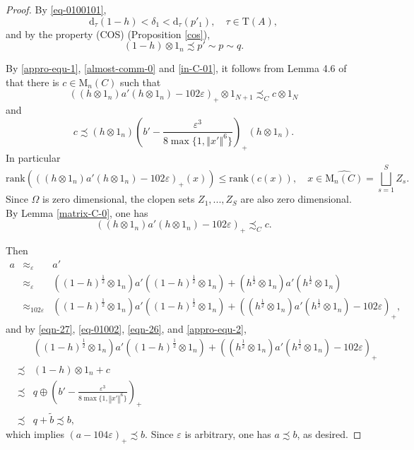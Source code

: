 \documentclass[12pt, oneside, psamsfonts]{amsart}
\theoremstyle{definition}
\theoremstyle{remark}
\numberwithin{equation}{section}
\newcommand{\norm}[1]{\left\Vert#1\right\Vert}
\newcommand{\eps}{\varepsilon}
\newcommand{\tr}{\mathrm{T}}
\begin{document}
\begin{proof}
By \eqref{eq-0100101}, $$\mathrm d_\tau(1-h) < \delta_1 < \mathrm{d}_\tau(p'_1),\quad \tau \in \tr(A),$$
and by the property (COS) (Proposition \ref{cos}), 
\begin{equation}\label{eq-01002}
(1 - h)\otimes 1_n \precsim p' \sim p \sim q.
\end{equation}


By \eqref{appro-equ-1}, \eqref{almost-comm-0} and \eqref{in-C-01}, it follows from Lemma 4.6 of \cite{Niu-MD-Z} that there is $c \in \mathrm{M}_n(C)$ such that
$$ ((h\otimes 1_n)a'(h\otimes 1_n) - 102\eps)_+\otimes 1_{N+1} \precsim_C c \otimes 1_N$$
and
\begin{equation}\label{eqn-26}
c \precsim (h \otimes 1_n )(b' - \frac{\eps^3}{8 \max\{1, \norm{x'}^6\}})_+(h\otimes 1_n).
\end{equation}
In particular
$$ \mathrm{rank}(((h\otimes 1_n)a'(h\otimes 1_n) - 102\eps)_+(x)) \leq \mathrm{rank}(c(x)), \quad x\in \widehat{\mathrm{M}_n(C)} = \bigsqcup_{s = 1}^S Z_s.$$
Since $\Omega$ is zero dimensional, the clopen sets $Z_1, ..., Z_S$ are also zero dimensional. By Lemma \ref{matrix-C-0}, 
one has 
\begin{equation}\label{eqn-27}
((h\otimes 1_n)a'(h\otimes 1_n) - 102\eps)_+ \precsim_C c.
\end{equation}

Then
\begin{eqnarray*}
a 
& \approx_{\eps} &
a' \\
& \approx_\eps &
((1-h)^{\frac{1}{2}} \otimes 1_n)a'((1-h)^{\frac{1}{2}} \otimes 1_n) + (h^{\frac{1}{2}} \otimes 1_n)a'(h^{\frac{1}{2}} \otimes 1_n) \\
& \approx_{102\eps} &
((1-h)^{\frac{1}{2}} \otimes 1_n)a'((1-h)^{\frac{1}{2}} \otimes 1_n) + ((h^{\frac{1}{2}} \otimes 1_n)a'(h^{\frac{1}{2}} \otimes 1_n) - 102\eps)_+,
\end{eqnarray*}
and by \eqref{eqn-27}, \eqref{eq-01002}, \eqref{eqn-26},  and \eqref{appro-equ-2},
\begin{eqnarray*}
&& ((1-h)^{\frac{1}{2}} \otimes 1_n)a'((1-h)^{\frac{1}{2}} \otimes 1_n) + ((h^{\frac{1}{2}} \otimes 1_n)a'(h^{\frac{1}{2}} \otimes 1_n) - 102\eps)_+\\
  & \precsim & (1-h) \otimes 1_n + c \\
& \precsim &q \oplus (b' - \frac{\eps^3}{8 \max\{1, \norm{x'}^6\}})_+ \\
& \precsim & q + \tilde{b} \precsim b,
\end{eqnarray*}
which implies $(a - 104\eps)_+ \precsim b$. Since $\eps$ is arbitrary, one has $a \precsim b$, as desired.
\end{proof}
\end{document}
